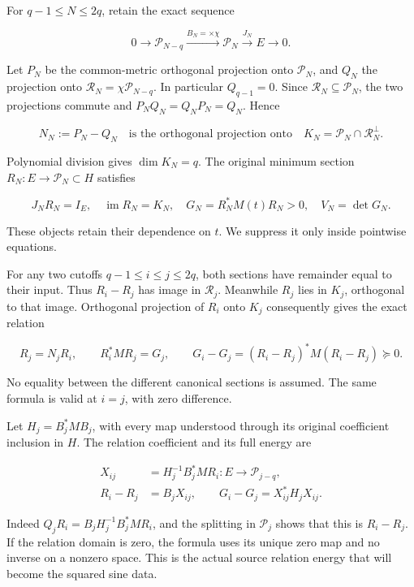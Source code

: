 For \(q-1\le N\le2q\), retain the exact sequence

\[
0\to\mathcal P_{N-q}\xrightarrow{B_N=\times\chi}
\mathcal P_N\xrightarrow{J_N}E\to0.
\tag{AA3}
\]

Let \(P_N\) be the common-metric orthogonal projection onto \(\mathcal P_N\), and \(Q_N\) the projection onto \(\mathcal R_N=\chi\mathcal P_{N-q}\). In particular \(Q_{q-1}=0\). Since \(\mathcal R_N\subseteq\mathcal P_N\), the two projections commute and \(P_NQ_N=Q_NP_N=Q_N\). Hence

\[
N_N:=P_N-Q_N
\quad\text{is the orthogonal projection onto}\quad
K_N=\mathcal P_N\cap\mathcal R_N^\perp.
\tag{AA4}
\]

Polynomial division gives \(\dim K_N=q\). The original minimum section \(R_N:E\to\mathcal P_N\subset H\) satisfies

\[
J_NR_N=I_E,\quad\operatorname{im}R_N=K_N,
\quad G_N=R_N^*M(t)R_N>0,\quad V_N=\det G_N.
\tag{AA5}
\]

These objects retain their dependence on \(t\). We suppress it only inside pointwise equations.

For any two cutoffs \(q-1\le i\le j\le2q\), both sections have remainder equal to their input. Thus \(R_i-R_j\) has image in \(\mathcal R_j\). Meanwhile \(R_j\) lies in \(K_j\), orthogonal to that image. Orthogonal projection of \(R_i\) onto \(K_j\) consequently gives the exact relation

\[
R_j=N_jR_i,\qquad
R_i^*MR_j=G_j,
\qquad
G_i-G_j=(R_i-R_j)^*M(R_i-R_j)\succeq0.
\tag{AA6}
\]

No equality between the different canonical sections is assumed. The same formula is valid at \(i=j\), with zero difference.

Let \(H_j=B_j^*M B_j\), with every map understood through its original coefficient inclusion in \(H\). The relation coefficient and its full energy are

\[
\begin{aligned}
X_{ij}&=H_j^{-1}B_j^*M R_i:E\to\mathcal P_{j-q},\\
R_i-R_j&=B_jX_{ij},\qquad
G_i-G_j=X_{ij}^*H_jX_{ij}.
\end{aligned}
\tag{AA7}
\]

Indeed \(Q_jR_i=B_jH_j^{-1}B_j^*MR_i\), and the splitting in \(\mathcal P_j\) shows that this is \(R_i-R_j\). If the relation domain is zero, the formula uses its unique zero map and no inverse on a nonzero space. This is the actual source relation energy that will become the squared sine data.

